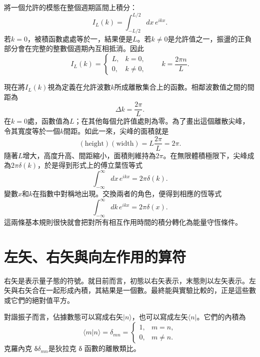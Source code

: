 將一個允許的模態在整個週期區間上積分：
\begin{equation}
I_L(k)=\int_{-L/2}^{L/2}dx\,e^{ikx}.
\end{equation}
若\(k=0\)，被積函數處處等於一，結果便是\(L\)。若\(k\neq0\)是允許值之一，振盪的正負部分會在完整的整數個週期內互相抵消。因此
\begin{equation}
I_L(k)=
\begin{cases}
L,&k=0,\\[4pt]
0,&k\neq0,
\end{cases}
\qquad
k=\frac{2\pi n}{L}.
\end{equation}

現在將\(I_L(k)\)視為定義在允許波數\(k\)所成離散集合上的函數。相鄰波數值之間的間距為
\begin{equation}
\Delta k=\frac{2\pi}{L}.
\end{equation}
在\(k=0\)處，函數值為\(L\)；在其他每個允許值處則為零。為了畫出這個離散尖峰，令其寬度等於一個\(k\)間距。如此一來，尖峰的面積就是
\begin{equation}
(\text{height})(\text{width})
=L\frac{2\pi}{L}=2\pi.
\end{equation}
隨著\(L\)增大，高度升高、間距縮小，面積則維持為\(2\pi\)。在無限體積極限下，尖峰成為\(2\pi\delta(k)\)，於是得到形式上的傅立葉恆等式
\begin{equation}
\int_{-\infty}^{\infty}dx\,e^{ikx}=2\pi\delta(k).
\end{equation}
變數\(x\)和\(k\)在指數中對稱地出現。交換兩者的角色，便得到相應的恆等式
\begin{equation}
\int_{-\infty}^{\infty}dk\,e^{ikx}=2\pi\delta(x).
\end{equation}
這兩條基本規則很快就會把對所有相互作用時間的積分轉化為能量守恆條件。

\section{左矢、右矢與向左作用的算符}

右矢是表示量子態的符號。就目前而言，初態以右矢表示，末態則以左矢表示。左矢與右矢合在一起形成內積，其結果是一個數。最終能與實驗比較的，正是這些數或它們的絕對值平方。

\begin{classroomqa}
\end{classroomqa}

對諧振子而言，佔據數態可以寫成右矢\(\lvert n\rangle\)，也可以寫成左矢\(\langle n\rvert\)。它們的內積為
\begin{equation}
\langle m\vert n\rangle=\delta_{mn}
=\begin{cases}
1,&m=n,\\
0,&m\neq n.
\end{cases}
\end{equation}
克羅內克 {\proseunicodefont δ}\(\delta_{mn}\)是狄拉克 {\proseunicodefont δ} 函數的離散類比。

